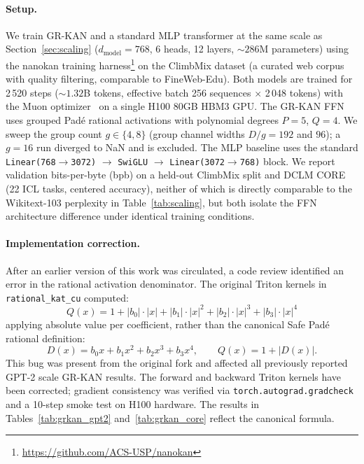 \documentclass{article}
\newcommand{\grkan}{\textsc{GR-KAN}}
\begin{document}
\paragraph{Setup.}
We train \grkan{} and a standard MLP transformer at the same scale as
Section~\ref{sec:scaling} ($d_\text{model}=768$, 6 heads, 12 layers,
${\sim}286$M parameters) using the nanokan training
harness\footnote{\url{https://github.com/ACS-USP/nanokan}} on the
ClimbMix dataset (a curated web corpus with quality filtering, comparable
to FineWeb-Edu).
Both models are trained for 2\,520 steps (${\sim}1.32$B tokens, effective
batch 256 sequences $\times$ 2\,048 tokens) with the Muon
optimizer~\citep{jordan2024muon} on a single H100 80GB HBM3 GPU.
The \grkan{} FFN uses grouped Pad\'{e} rational activations with polynomial
degrees $P=5$, $Q=4$. We sweep the group count $g \in \{4, 8\}$ (group channel
widths $D/g = 192$ and $96$); a $g=16$ run diverged to NaN and is excluded.
The MLP baseline uses the
standard \texttt{Linear(768$\to$3072)} $\to$ \texttt{SwiGLU}
$\to$ \texttt{Linear(3072$\to$768)} block.
We report validation bits-per-byte (bpb) on a held-out ClimbMix split
and DCLM CORE (22 ICL tasks, centered accuracy), neither of which is
directly comparable to the Wikitext-103 perplexity in
Table~\ref{tab:scaling}, but both isolate the FFN architecture difference under
identical training conditions.

\paragraph{Implementation correction.}
After an earlier version of this work was circulated, a code review identified
an error in the rational activation denominator.
The original Triton kernels in \texttt{rational\_kat\_cu} computed:
\[
Q(x) = 1 + |b_0|\!\cdot\!|x| + |b_1|\!\cdot\!|x|^2 + |b_2|\!\cdot\!|x|^3 + |b_3|\!\cdot\!|x|^4
\]
applying absolute value per coefficient, rather than the canonical Safe
Pad\'{e} rational definition:
\[
D(x) = b_0 x + b_1 x^2 + b_2 x^3 + b_3 x^4,\qquad
Q(x) = 1 + |D(x)|.
\]
This bug was present from the original fork and affected all previously
reported GPT-2 scale \grkan{} results.
The forward and backward Triton kernels have been corrected; gradient
consistency was verified via \texttt{torch.autograd.gradcheck} and a
10-step smoke test on H100 hardware.
The results in Tables~\ref{tab:grkan_gpt2} and~\ref{tab:grkan_core}
reflect the canonical formula.
\end{document}
